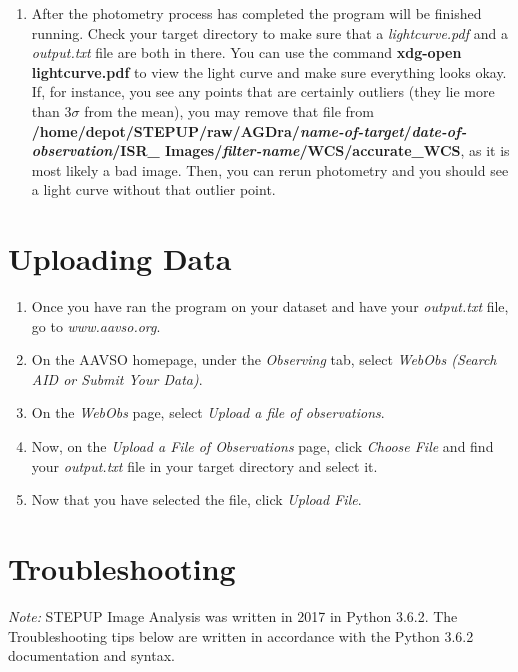 \documentclass[11pt]{report}
\begin{document}
\begin{enumerate}
\item After the photometry process has completed the program will be finished running. Check your target directory to make sure that a \emph{lightcurve.pdf} and a \emph{output.txt} file are both in there. You can use the command {\bf xdg-open lightcurve.pdf} to view the light curve and make sure everything looks okay. If, for instance, you see any points that are certainly outliers (they lie more than 3$\sigma$ from the mean), you may remove that file from {\bf /home/depot/STEPUP/raw/AGDra/\emph{name-of-target}/\emph{date-of-observation}/ISR\_ \linebreak Images/\emph{filter-name}/WCS/accurate\_WCS}, as it is most likely a bad image. Then, you can rerun photometry and you should see a light curve without that outlier point.
\end{enumerate}

\chapter{Uploading Data}
\begin{enumerate}
\item Once you have ran the program on your dataset and have your \emph{output.txt} file, go to \emph{www.aavso.org}.
\item On the AAVSO homepage, under the \emph{Observing} tab, select \emph{WebObs (Search AID or Submit Your Data)}.
\item On the \emph{WebObs} page, select \emph{Upload a file of observations}.
\item Now, on the \emph{Upload a File of Observations} page, click \emph{Choose File} and find your \emph{output.txt} file in your target directory and select it.
\item Now that you have selected the file, click \emph{Upload File}.
\end{enumerate}

\chapter{Troubleshooting}
\emph{Note:} STEPUP Image Analysis was written in 2017 in Python 3.6.2. The Troubleshooting tips below are written in accordance with the Python 3.6.2 documentation and syntax. 
\end{document}
